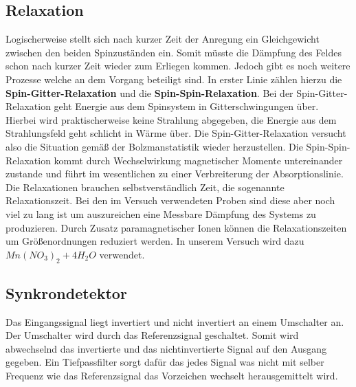 \documentclass[12pt]{article}
\begin{document}
\subsection{Relaxation}
Logischerweise stellt sich nach kurzer Zeit der Anregung ein Gleichgewicht zwischen den beiden Spinzuständen ein.
Somit müsste die Dämpfung des Feldes schon nach kurzer Zeit wieder zum Erliegen kommen. Jedoch gibt es noch weitere Prozesse welche an dem Vorgang beteiligt sind. In erster Linie zählen hierzu die \textbf{Spin-Gitter-Relaxation} und die \textbf{Spin-Spin-Relaxation}. Bei der Spin-Gitter-Relaxation geht Energie aus dem Spinsystem in Gitterschwingungen über. Hierbei wird praktischerweise keine Strahlung abgegeben, die Energie aus dem Strahlungsfeld geht schlicht in Wärme über. Die Spin-Gitter-Relaxation versucht also die Situation gemäß der Bolzmanstatistik wieder herzustellen. Die Spin-Spin-Relaxation kommt durch Wechselwirkung magnetischer Momente untereinander zustande und führt im wesentlichen zu einer Verbreiterung der Absorptionslinie.\\

Die Relaxationen brauchen selbstverständlich Zeit, die sogenannte Relaxationszeit. Bei den im Versuch verwendeten Proben sind diese aber noch viel zu lang ist um auszureichen eine Messbare Dämpfung des Systems zu produzieren. Durch Zusatz paramagnetischer Ionen können die Relaxationszeiten um Größenordnungen reduziert werden. In unserem Versuch wird dazu $Mn(NO_3)_2 + 4H_2O$ verwendet.

\subsection{Synkrondetektor}
Das Eingangssignal liegt invertiert und nicht invertiert an einem Umschalter an. Der Umschalter wird durch das Referenzsignal geschaltet. Somit wird abwechselnd das invertierte und das nichtinvertierte Signal auf den Ausgang gegeben. Ein Tiefpassfilter sorgt dafür das jedes Signal was nicht mit selber Frequenz wie das Referenzsignal das Vorzeichen wechselt herausgemittelt wird.\\
\end{document}
